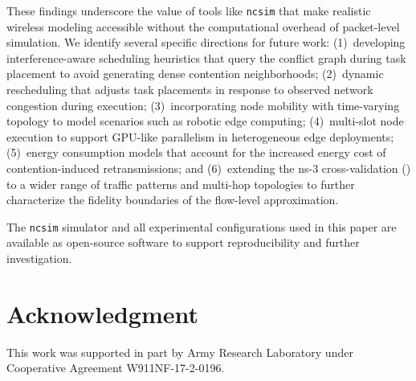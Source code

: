 \documentclass[conference]{IEEEtran}
\newcommand{\ncsim}{\texttt{ncsim}}
\begin{document}
These findings underscore the value of tools like \ncsim{} that make
realistic wireless modeling accessible without the computational overhead
of packet-level simulation.  We identify several specific directions for
future work: (1)~developing interference-aware scheduling heuristics that
query the conflict graph during task placement to avoid generating dense
contention neighborhoods; (2)~dynamic rescheduling that adjusts task
placements in response to observed network congestion during execution;
(3)~incorporating node mobility with time-varying topology to model
scenarios such as robotic edge computing; (4)~multi-slot node execution
to support GPU-like parallelism in heterogeneous edge deployments;
(5)~energy consumption models that account for the increased energy cost
of contention-induced retransmissions; and (6)~extending the ns-3
cross-validation () to a wider range of traffic
patterns and multi-hop topologies to further characterize the fidelity
boundaries of the flow-level approximation.

The \ncsim{} simulator and all experimental configurations used in this
paper are available as open-source software to support reproducibility
and further investigation.


\section*{Acknowledgment}
This work was supported in part by Army Research Laboratory under Cooperative Agreement W911NF-17-2-0196.
\end{document}
